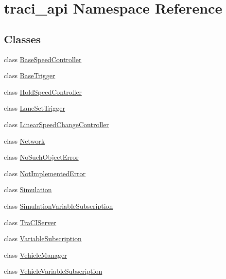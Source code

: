 \hypertarget{namespacetraci__api}{}\section{traci\+\_\+api Namespace Reference}
\label{namespacetraci__api}
\subsection*{Classes}
\begin{DoxyCompactItemize}
\item 
class \hyperlink{classtraci__api_1_1_base_speed_controller}{Base\+Speed\+Controller}
\item 
class \hyperlink{classtraci__api_1_1_base_trigger}{Base\+Trigger}
\item 
class \hyperlink{classtraci__api_1_1_hold_speed_controller}{Hold\+Speed\+Controller}
\item 
class \hyperlink{classtraci__api_1_1_lane_set_trigger}{Lane\+Set\+Trigger}
\item 
class \hyperlink{classtraci__api_1_1_linear_speed_change_controller}{Linear\+Speed\+Change\+Controller}
\item 
class \hyperlink{classtraci__api_1_1_network}{Network}
\item 
class \hyperlink{classtraci__api_1_1_no_such_object_error}{No\+Such\+Object\+Error}
\item 
class \hyperlink{classtraci__api_1_1_not_implemented_error}{Not\+Implemented\+Error}
\item 
class \hyperlink{classtraci__api_1_1_simulation}{Simulation}
\item 
class \hyperlink{classtraci__api_1_1_simulation_variable_subscription}{Simulation\+Variable\+Subscription}
\item 
class \hyperlink{classtraci__api_1_1_tra_c_i_server}{Tra\+C\+I\+Server}
\item 
class \hyperlink{classtraci__api_1_1_variable_subscription}{Variable\+Subscription}
\item 
class \hyperlink{classtraci__api_1_1_vehicle_manager}{Vehicle\+Manager}
\item 
class \hyperlink{classtraci__api_1_1_vehicle_variable_subscription}{Vehicle\+Variable\+Subscription}
\end{DoxyCompactItemize}
